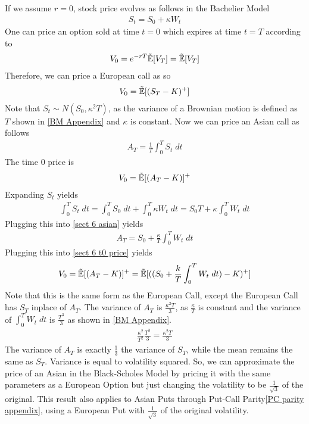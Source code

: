 \documentclass[reqno]{amsart}
\newcommand{\rE}[1]{\tilde{\E}[#1]}
\begin{document}
If we assume $r=0$, stock price evolves as follows in the Bachelier Model
\begin{align}
     S_t = S_0 + \kappa W_t
\end{align}
One can price an option sold at time $t=0$ which expires at time $t=T$ according to
\begin{align}
     V_0 = e^{-rT} \rE{V_T} = \rE{V_T}
\end{align}
Therefore, we can price a European call as so
\begin{align}
     V_0 = \rE{(S_T-K)^{+}}
\end{align}
Note that $S_t \sim N(S_0,\kappa^2T)$, as the variance of a Brownian motion is defined as $T$ shown in \eqref{BM Appendix} and $\kappa$ is constant. 
Now we can price an Asian call as follows
\begin{align} \label{sect 6 asian}
     A_T = \frac{1}{T} \int_0^T S_t \; dt
\end{align}
The time 0 price is
\begin{align} \label{sect 6 t0 price}
     V_0 = \rE{(A_T-K)}^{+}
\end{align}
Expanding $S_t$ yields
\begin{align}
     \int_0^T S_t \; dt = \int_0^T S_0 \; dt + \int_0^T \kappa W_t \; dt = S_0T + \kappa \int_0^T W_t \; dt
\end{align}
Plugging this into \eqref{sect 6 asian} yields
\begin{align} 
     A_T = S_0 + \frac{\kappa}{T} \int_0^T W_t \; dt
\end{align}
Plugging this into \eqref{sect 6 t0 price} yields
\begin{align}
     V_0 = \rE{(A_T-K)}^{+} = \rE{({(S_0 + \frac{k}{T} \int_0^T W_t \; dt) - K})^+} 
\end{align}
Note that this is the same form as the European Call, except the European Call has $S_T$ inplace of $A_T$.
The variance of $A_T$ is $\frac{\kappa^2T}{3}$, as $\frac{\kappa}{T}$ is constant and the variance of $\int_0^T W_t \; dt$ is $\frac{T^3}{3}$ as shown in \eqref{BM Appendix}. %
\begin{align}
     \frac{\kappa^2}{T^2} \frac{T^3}{3}= \frac{\kappa^2 T}{3}
\end{align}
The variance of $A_T$ is exactly $\frac{1}{3}$ the variance of $S_T$, while the mean remains the same as $S_T$.
Variance is equal to volatility squared.
So, we can approximate the price of an Asian in the Black-Scholes Model by pricing it with the same parameters as a European Option 
but just changing the volatility to be $\frac{1}{\sqrt{3}}$ of the original. 
This result also applies to Asian Puts through Put-Call Parity\eqref{PC parity appendix}, 
using a European Put with $\frac{1}{\sqrt{3}}$ of the original volatility.
\end{document}
